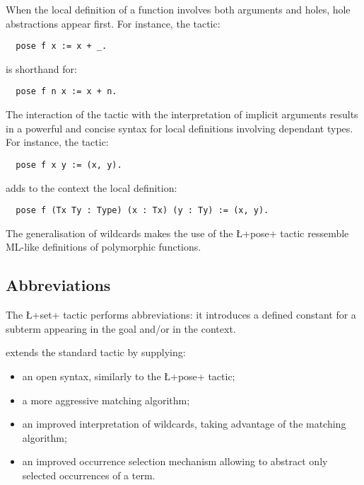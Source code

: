 When the local definition of a function involves both arguments and
holes, hole abstractions appear first. For instance, the
tactic:
\begin{lstlisting}
  pose f x := x + _.
\end{lstlisting}
is shorthand for:
\begin{lstlisting}
  pose f n x := x + n.
\end{lstlisting}


The interaction of the  tactic with the interpretation of
implicit arguments results in a powerful and concise syntax for local
definitions involving dependant types.
For instance, the tactic:
\begin{lstlisting}
  pose f x y := (x, y).
\end{lstlisting}
adds to the context the local definition:
\begin{lstlisting}
  pose f (Tx Ty : Type) (x : Tx) (y : Ty) := (x, y).
\end{lstlisting}
The generalisation of wildcards makes the use of the \L+pose+ tactic
ressemble ML-like definitions of polymorphic functions.




\subsection{Abbreviations}\label{ssec:set}


The \ssr{} \L+set+ tactic performs abbreviations: it introduces a
defined constant for a subterm appearing in the goal and/or in the
context.

\ssr{} extends the standard \Coq{}  tactic by supplying:
\begin{itemize}
\item an open syntax, similarly to the \L+pose+ tactic;
\item a more aggressive matching algorithm;
\item an improved interpretation of wildcards, taking advantage of the
  matching algorithm;
\item an improved occurrence selection mechanism allowing to abstract only
  selected occurrences of a term.
\end{itemize}

